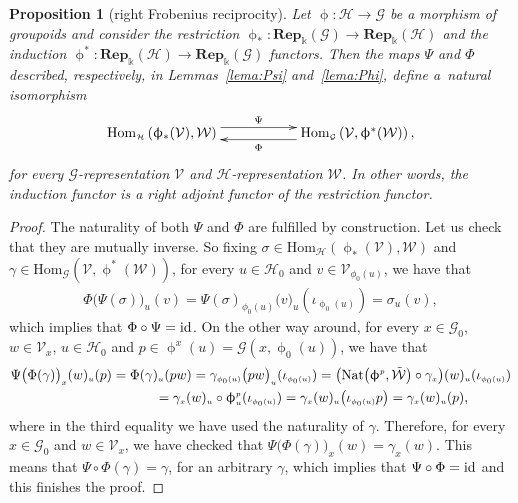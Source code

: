 \documentclass[pdftex]{sigma}
\numberwithin{equation}{section}
\newtheorem{Proposition}[Theorem]{Proposition}
 { \theoremstyle{definition}
\newtheorem{Definition}[Theorem]{Definition}
\newtheorem{Remark}[Theorem]{Remark}
\newtheorem{Example}[Theorem]{Example}
 }
\renewcommand{\hom}[3]{\mathrm{Hom}_{\Sscript{#1}}\left(#2, #3\right)}
\newcommand{\Rep}[1]{\mathbf{Rep}_{\Sscript{\Bbbk}}(#1)}
\newcommand{\Go}{\cG_{\Sscript{0}}}
\newcommand{\Ho}{\cH_{\Sscript{0}}}
\newcommand{\Vx}{\cV_{\Sscript{x}}}
\newcommand{\cG}{{\mathcal G}}
\newcommand{\cH}{{\mathcal H}}
\newcommand{\cV}{{\mathcal V}}
\newcommand{\cW}{{\mathcal W}}
\newcommand{\Sscript}[1]{\scriptscriptstyle{#1}}
\begin{document}
\begin{Proposition}[right Frobenius reciprocity]\label{prop:FrobeniusR} Let $\upphi\colon \cH \to \cG$ be a morphism of groupoids and consider the restriction $\upphi_{*}\colon \Rep{\cG} \to \Rep{\cH}$ and the induction $\upphi^{*}\colon \Rep{\cH} \to \Rep{\cG}$ functors. Then the maps $\Psi$ and $\Phi$ described, respectively, in Lemmas~{\rm \ref{lema:Psi}} and~{\rm \ref{lema:Phi}}, define a~natural isomorphism
\begin{gather*}
\xymatrix@R=0pt{ \hom{\cH}{\upphi_{*}(\cV)}{\cW} \ar@<1ex>@{->}^-{\Psi}[rr] & & \hom{\cG}{\cV}{\upphi^*(\cW)},\ar@<1ex>@{->}^-{\Phi}[ll] }
\end{gather*}
for every $\cG$-representation $\cV$ and $\cH$-representation $\cW$. In other words, the induction functor is a right adjoint functor of the restriction functor.
\end{Proposition}
\begin{proof}The naturality of both $\Psi$ and $\Phi$ are fulfilled by construction. Let us check that they are mutually inverse. So fixing $\sigma \in \hom{\cH}{\upphi_*(\cV)}{\cW}$ and $\gamma \in \hom{\cG}{\cV}{\upphi^*(\cW)}$, for every $u \in \Ho$ and $v \in \cV_{\Sscript{\phi_0(u)}}$, we have that
\begin{gather*}
\Phi\big( \Psi(\sigma)\big)_{\Sscript{u}}(v) =\Psi(\sigma)_{\Sscript{\phi_0(u)}}\big( v\big)_{\Sscript{u}}(\iota_{\Sscript{\upphi_0(u)}}) = \sigma_{\Sscript{u}}(v),
\end{gather*}
which implies that $\Phi \circ \Psi= {\rm id}$. On the other way around, for every $x \in \Go$, $w \in \Vx$, $u \in \Ho$ and $p \in \upphi^{\Sscript{x}}(u)=\cG(x,\upphi_{\Sscript{0}}(u))$, we have that
\begin{gather*}
\Psi\big( \Phi(\gamma)\big)_{\Sscript{x}}(w)_{\Sscript{u}}(p) = \Phi(\gamma)_{\Sscript{u}}(p w) =\gamma_{\Sscript{\phi_{\Sscript{0}}(u)}}\big( p w\big)_{\Sscript{u}}(\iota_{\Sscript{\phi_0(u)}}) =
 \big( {\rm Nat}\big(\upphi^{\Sscript{p}}, \tilde{\cW}\big) \circ \gamma_{\Sscript{x}}\big)(w)_{\Sscript{u}}(\iota_{\Sscript{\phi_0(u)}})\\
\hphantom{\Psi\big( \Phi(\gamma)\big)_{\Sscript{x}}(w)_{\Sscript{u}}(p)}{}
 = \gamma_{\Sscript{x}}(w)_{\Sscript{u}} \circ \upphi^{\Sscript{p}}_{\Sscript{u}}(\iota_{\Sscript{\phi_0(u)}}) = \gamma_{\Sscript{x}}(w)_{\Sscript{u}}\big(\iota_{\Sscript{\phi_0(u)}} p\big) =
\gamma_{\Sscript{x}}(w)_{\Sscript{u}}(p),
\end{gather*}
where in the third equality we have used the naturality of $\gamma$. Therefore, for every $x \in \Go$ and $w \in \Vx$, we have checked that $\Psi\big( \Phi(\gamma)\big)_{\Sscript{x}}(w)= \gamma_{\Sscript{x}}(w)$. This means that $\Psi \circ \Phi (\gamma)= \gamma$, for an arbitrary $\gamma$, which implies that $\Psi \circ \Phi = {\rm id}$ and this finishes the proof.
\end{proof}
\end{document}
